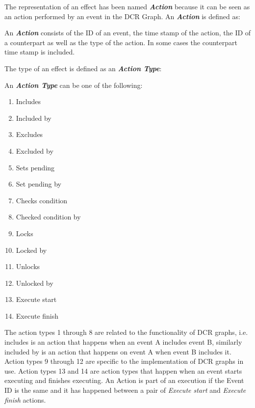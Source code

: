 	\newpar The representation of an effect has been named \textit{\textbf{Action}} because it can be seen as an action performed by an event in the DCR Graph. An \textit{\textbf{Action}} is defined as:
	
	\begin{definition}
		An \textit{\textbf{Action}} consists of the ID of an event, the time stamp of the action, the ID of a counterpart as well as  the type of the action. In some cases the counterpart time stamp is included.
	\end{definition}
	
	\newpar	The type of an effect is defined as an \textit{\textbf{Action Type}}:
	
	\begin{definition}
		An \textit{\textbf{Action Type}} can be one of the following:
		\begin{multicols}{3}
			\begin{enumerate}
				\item Includes
				\item Included by
				\item Excludes
				\item Excluded by
				\item Sets pending
				\item Set pending by
				\item Checks condition
				\item Checked condition by
				\item Locks
				\item Locked by
				\item Unlocks
				\item Unlocked by
				\item Execute start
				\item Execute finish
			\end{enumerate}
		\end{multicols}
	\end{definition}
	
	\newpar The action types 1 through 8 are related to the functionality of DCR graphs, i.e. includes is an action that happens when an event A includes event B, similarly included by is an action that happens on event A when event B includes it. Action types 9 through 12 are specific to the implementation of DCR graphs in use. Action types 13 and 14 are action types that happen when an event starts executing and finishes executing. An Action is part of an execution if the Event ID is the same and it has happened between a pair of \textit{Execute start} and \textit{Execute finish} actions.
	
